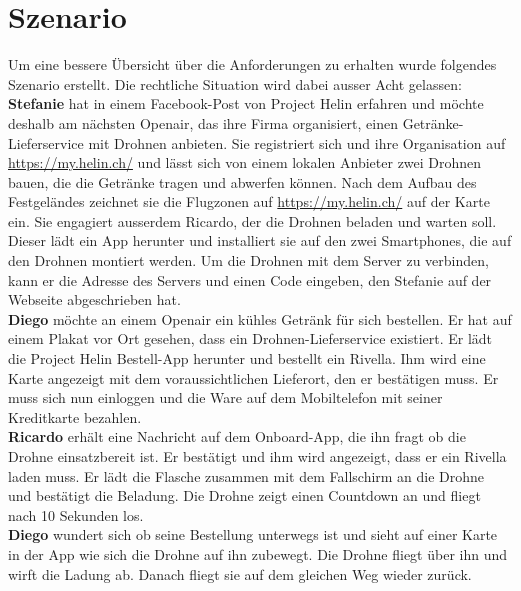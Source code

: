 \section{Szenario}

Um eine bessere Übersicht über die Anforderungen zu erhalten wurde folgendes Szenario erstellt. Die rechtliche Situation wird dabei ausser Acht gelassen:\\

\textbf{Stefanie} hat in einem Facebook-Post von Project Helin erfahren und möchte deshalb am nächsten Openair, das ihre Firma organisiert, einen Getränke-Lieferservice mit Drohnen anbieten. Sie registriert sich und ihre Organisation auf \url{https://my.helin.ch/} und lässt sich von einem lokalen Anbieter zwei Drohnen bauen, die die Getränke tragen und abwerfen können. Nach dem Aufbau des Festgeländes zeichnet sie die Flugzonen auf \url{https://my.helin.ch/} auf der Karte ein. Sie engagiert ausserdem Ricardo, der die Drohnen beladen und warten soll. Dieser lädt ein App herunter und installiert sie auf den zwei Smartphones, die auf den Drohnen montiert werden. Um die Drohnen mit dem Server zu verbinden, kann er die Adresse des Servers und einen Code eingeben, den Stefanie auf der Webseite abgeschrieben hat.\\

\textbf{Diego} möchte an einem Openair ein kühles Getränk für sich bestellen. Er hat auf einem Plakat vor Ort gesehen, dass ein Drohnen-Lieferservice existiert. Er lädt die Project Helin Bestell-App herunter und bestellt ein Rivella. Ihm wird eine Karte angezeigt mit dem voraussichtlichen Lieferort, den er bestätigen muss. Er muss sich nun einloggen und die Ware auf dem Mobiltelefon mit seiner Kreditkarte bezahlen.\\

\textbf{Ricardo} erhält eine Nachricht auf dem Onboard-App, die ihn fragt ob die Drohne einsatzbereit ist. Er bestätigt und ihm wird angezeigt, dass er ein Rivella laden muss. Er lädt die Flasche zusammen mit dem Fallschirm an die Drohne und bestätigt die Beladung. Die Drohne zeigt einen Countdown an und fliegt nach 10 Sekunden los. \\

\textbf{Diego} wundert sich ob seine Bestellung unterwegs ist und sieht auf einer Karte in der App wie sich die Drohne auf ihn zubewegt. Die Drohne fliegt über ihn und wirft die Ladung ab. Danach fliegt sie auf dem gleichen Weg wieder zurück.\\

